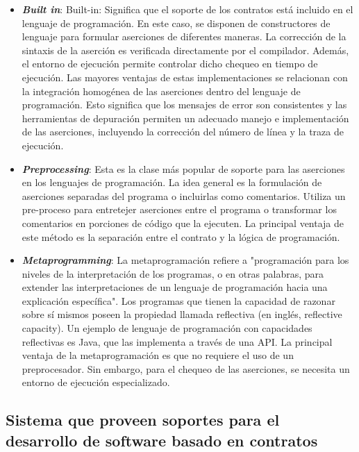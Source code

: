 \begin{itemize}

 \item \textbf{\textit{Built in}}: Built-in: Significa que el soporte de los contratos está incluido en el lenguaje de programación. En este caso, se disponen de constructores de lenguaje para formular aserciones de diferentes maneras. La corrección de la sintaxis de la aserción es verificada directamente por el compilador. Además, el entorno de ejecución permite controlar dicho chequeo en tiempo de ejecución. Las mayores ventajas de estas implementaciones se relacionan con la integración homogénea de las aserciones dentro del lenguaje de programación. Esto significa que los mensajes de error son consistentes y las herramientas de depuración permiten un adecuado manejo e implementación de las aserciones, incluyendo la corrección del número de línea y la traza de ejecución.


\item \textbf{\textit{Preprocessing}}: Esta es la clase más popular de soporte para las aserciones en los lenguajes de programación. La idea general es la formulación de aserciones separadas del programa o incluirlas como comentarios. Utiliza un pre-proceso para entretejer aserciones entre el programa o transformar los comentarios en porciones de código que la ejecuten. La principal ventaja de este método es la separación entre el contrato y la lógica de programación.


\item \textbf{\textit{Metaprogramming}}: La metaprogramación refiere a "programación para los niveles de la interpretación de los programas, o en otras palabras, para extender las interpretaciones de un lenguaje de programación hacia una explicación específica"\cite{Temp1}.
Los programas que tienen la capacidad de razonar sobre sí mismos poseen la propiedad llamada reflectiva (en inglés, reflective capacity). Un ejemplo de lenguaje de programación con capacidades reflectivas es Java, que las implementa a través de una API. La principal ventaja de la metaprogramación es que no requiere el uso de un preprocesador. Sin embargo, para el chequeo de las aserciones, se necesita un entorno de ejecución especializado.
\end{itemize}

\subsection{Sistema que proveen soportes para el desarrollo de software basado en contratos} \label{sec:sistemasca}

